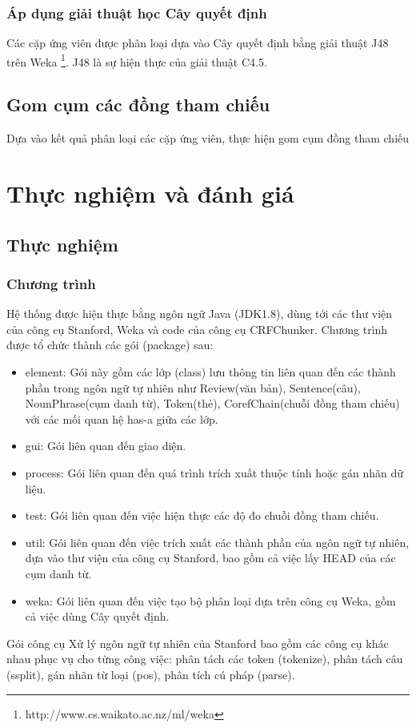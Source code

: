 \documentclass[12pt]{extarticle}
\begin{document}
			\subsubsection*{Áp dụng giải thuật học Cây quyết định}
				\par Các cặp ứng viên được phân loại dựa vào Cây quyết định bằng giải thuật J48 trên Weka \footnote{http://www.cs.waikato.ac.nz/ml/weka}. J48 là sự hiện thực của giải thuật C4.5.
		\subsection{Gom cụm các đồng tham chiếu}	
			\par Dựa vào kết quả phân loại các cặp ứng viên, thực hiện gom cụm đồng tham chiếu							

	\section{Thực nghiệm và đánh giá}
		\subsection{Thực nghiệm}
			\subsubsection*{Chương trình}
				\par Hệ thống được hiện thực bằng ngôn ngữ Java (JDK1.8), dùng tới các thư viện của công cụ Stanford, Weka và code của công cụ CRFChunker. Chương trình được tổ chức thành các gói (package) sau:
				\begin{itemize}
					\item{element: Gói này gồm các lớp (class) lưu thông tin liên quan đến các thành phần trong ngôn ngữ tự nhiên như Review(văn bản), Sentence(câu), NounPhrase(cụm danh từ), Token(thẻ), CorefChain(chuỗi đồng tham chiếu) với các mối quan hệ has-a giữa các lớp.}
					\item{gui: Gói liên quan đến giao diện.}
					\item{process: Gói liên quan đến quá trình trích xuất thuộc tính hoặc gán nhãn dữ liệu.}
					\item{test: Gói liên quan đến việc hiện thực các độ đo chuỗi đồng tham chiếu.}
					\item{util: Gói liên quan đến việc trích xuất các thành phần của ngôn ngữ tự nhiên, dựa vào thư viện của công cụ Stanford, bao gồm cả việc lấy HEAD của các cụm danh từ.}
					\item{weka: Gói liên quan đến việc tạo bộ phân loại dựa trên công cụ Weka, gồm cả việc dùng Cây quyết định.}
				\end{itemize}
				\par Gói công cụ Xử lý ngôn ngữ tự nhiên của Stanford bao gồm các công cụ khác nhau phục vụ cho từng công việc: phân tách các token (tokenize), phân tách câu (ssplit), gán nhãn từ loại (pos), phân tích cú pháp (parse).
\end{document}

